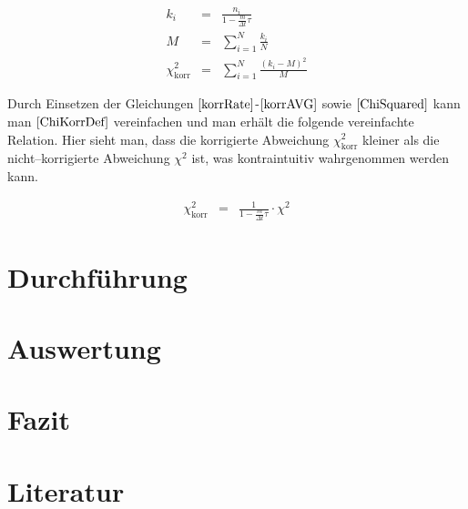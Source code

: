 \documentclass[12pt,a4paper]{scrartcl}
\numberwithin{equation}{section} %
\renewcommand{\[}{} %
\renewcommand{\]}{\noindent} %
\begin{document}
\[
\begin{eqnarray}
    k_i &=&
        \frac{
            n_i
        }{
            1 - \frac{m}{\Delta t}\tau
        } \label{korrRate} \\
    M &=& \sum_{i=1}^N \frac{k_i}{N} \label{korrAVG} \\
    \chi^2_\mathrm{korr} &=& \sum_{i=1}^N
        \frac{(k_i - M)^2}{M} \label{ChiKorrDef}
\end{eqnarray}
\]

Durch Einsetzen der Gleichungen \(\eqref{korrRate}\)-\(\eqref{korrAVG}\)
sowie \(\eqref{ChiSquared}\) kann man \(\eqref{ChiKorrDef}\)
vereinfachen und man erhält die folgende vereinfachte Relation. Hier
sieht man, dass die korrigierte Abweichung \(\chi^2_\mathrm{korr}\)
kleiner als die nicht--korrigierte Abweichung \(\chi^2\) ist, was
kontraintuitiv wahrgenommen werden kann.

\[
\begin{eqnarray}
    \chi^2_\mathrm{korr} &=&
        \frac{1}{1 - \frac{m}{\Delta t}\tau} \cdot \chi^2
\end{eqnarray}
\]

\clearpage
\hypertarget{durchfuxfchrung}{%
\section{Durchführung}\label{durchfuxfchrung}}

\clearpage
\hypertarget{auswertung}{%
\section{Auswertung}\label{auswertung}}

\clearpage
\hypertarget{fazit}{%
\section{Fazit}\label{fazit}}

\clearpage
\hypertarget{literatur}{%
\section{Literatur}\label{literatur}}
\end{document}

